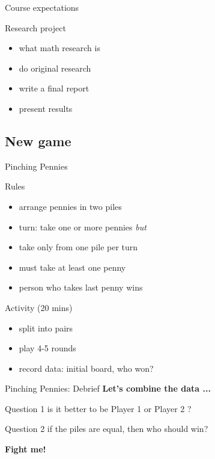\documentclass{beamer}
\begin{document}
\begin{frame}{Course expectations}
\pause
  \begin{block}{Research project}
    \begin{itemize}
\pause
      \item what math research is
\pause
      \item do original research
\pause
      \item write a final report
\pause
      \item present results
    \end{itemize}
  \end{block}
\end{frame}

\subsection{New game}
\begin{frame}{Pinching Pennies}
\pause
  \begin{block}{Rules}
    \begin{itemize}
\pause
      \item arrange pennies in two piles
\pause
      \item turn: take one or more pennies \emph{but}
\pause
      \item take only from one pile per turn
\pause
      \item must take at least one penny
\pause
      \item person who takes last penny wins
    \end{itemize}
  \end{block}
\pause
  \begin{block}{Activity (20 mins)}
    \begin{itemize}
\pause
      \item split into pairs
\pause
      \item play 4-5 rounds
\pause
      \item {\color{red}record data:} initial board, who won? 
    \end{itemize}
  \end{block}
\end{frame}

\begin{frame}{Pinching Pennies: Debrief}
\pause
\textbf{Let's combine the data ...}
\pause
  \begin{block}{Question 1}
     is it better to be {\color{blue}Player 1} or {\color{green}Player 2} ?
  \end{block}
\pause
  \begin{block}{Question 2}
     if the piles are equal, then who should win?
  \end{block}
\pause
\begin{center}
\textbf{Fight me!}
\end{center}
\end{frame}
\end{document}
